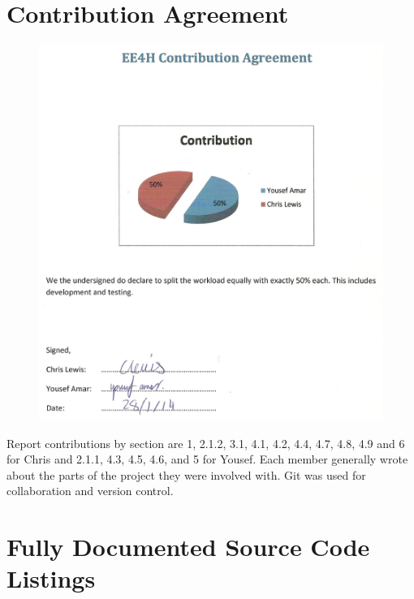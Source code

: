 \documentclass[a4paper,12pt,notitlepage]{article}
\begin{document}
\begin{appendices}
	\section{Contribution Agreement}
		\begin{figure}[H]
			\centering
			\includegraphics[width=\textwidth]{chris/image36}
		\end{figure}
		Report contributions by section are 1, 2.1.2, 3.1, 4.1, 4.2, 4.4, 4.7, 4.8, 4.9 and 6 for Chris and 2.1.1, 4.3, 4.5, 4.6, and 5 for Yousef. Each member generally wrote about the parts of the project they were involved with. Git was used for collaboration and version control.
	\pagebreak
	\section{Fully Documented Source Code Listings}

\end{appendices}
\end{document}
